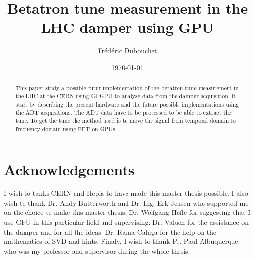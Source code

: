 \documentclass[a4paper]{report}
\title{Betatron tune measurement in the LHC damper using GPU}
\author{Fr\'ed\'eric Dubouchet}
\date{\today}
\begin{document}
\maketitle

\begin{abstract}
	This paper study a possible futur implementation of the betatron tune measurement in the \gls{LHC} at the \gls{CERN} using \gls{GPGPU} to analyse data from the \gls{damper} acquisition. It start by describing the present hardware and the future possible implementations using the \gls{ADT} acquisitions. The \gls{ADT} data have to be processed to be able to extract the \gls{tune}. To get the tune the method used is to move the signal from temporal domain to frequency domain using \gls{FFT} on \glspl{GPU}.
\end{abstract}

\chapter*{Acknowledgements}
	I wish to tanks \gls{CERN} and \gls{Hepia} to have made this master thesis possible. I also wish to thank Dr. Andy Butterworth and Dr. Ing. Erk Jensen who supported me on the choice to make this master thesis, Dr. Wolfgang H{\"o}fle for suggesting that I use GPU in this particular field and supervising. Dr. Valuch for the assistance on the damper and for all the ideas. Dr. Rama Calaga for the help on the mathematics of \gls{SVD} and hints. Finaly, I wish to thank Pr. Paul Albuquerque who was my professor and supervisor during the whole thesis.

\tableofcontents
\listoffigures
\listoftables







\printglossaries


\end{document}
